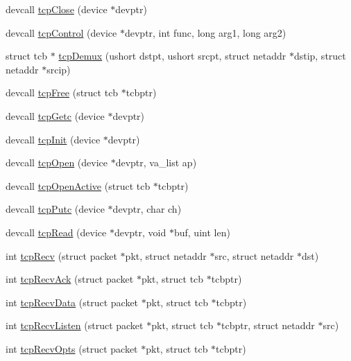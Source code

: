 \begin{DoxyCompactItemize}
\item 
devcall \hyperlink{group__tcp_gaf2201252cc913e86fe5a373d7de34ce1}{tcp\-Close} (device $\ast$devptr)
\item 
devcall \hyperlink{group__tcp_gaec53b1eedec31d820839a58848186ba8}{tcp\-Control} (device $\ast$devptr, int func, long arg1, long arg2)
\item 
struct tcb $\ast$ \hyperlink{group__tcp_gaa4058dc134ea0d6fe0e7317506d950f1}{tcp\-Demux} (ushort dstpt, ushort srcpt, struct netaddr $\ast$dstip, struct netaddr $\ast$srcip)
\item 
devcall \hyperlink{group__tcp_ga198efe4277244205130d48ee968f1637}{tcp\-Free} (struct tcb $\ast$tcbptr)
\item 
devcall \hyperlink{group__tcp_ga303c6d47bcc758c70437f3ff5c87eac8}{tcp\-Getc} (device $\ast$devptr)
\item 
devcall \hyperlink{group__tcp_gae7df99509f17d9b30690259c54609971}{tcp\-Init} (device $\ast$devptr)
\item 
devcall \hyperlink{group__tcp_ga230f078f96a8801c3ad397608bcf0024}{tcp\-Open} (device $\ast$devptr, va\-\_\-list ap)
\item 
devcall \hyperlink{group__tcp_ga72ec23c6f1f48df8cb9d1be254f78633}{tcp\-Open\-Active} (struct tcb $\ast$tcbptr)
\item 
devcall \hyperlink{group__tcp_ga806281518a04d24bb69d002f646de124}{tcp\-Putc} (device $\ast$devptr, char ch)
\item 
devcall \hyperlink{group__tcp_ga05afe88a1739bc885bb7c36e78b1abb8}{tcp\-Read} (device $\ast$devptr, void $\ast$buf, uint len)
\item 
int \hyperlink{group__tcp_gacfb5a1029610c46c6b613083c5c64b4b}{tcp\-Recv} (struct packet $\ast$pkt, struct netaddr $\ast$src, struct netaddr $\ast$dst)
\item 
int \hyperlink{group__tcp_gac5d9dee72be6259d34f7485488fa1ec2}{tcp\-Recv\-Ack} (struct packet $\ast$pkt, struct tcb $\ast$tcbptr)
\item 
int \hyperlink{group__tcp_ga30aa46165497d851dc343bc9e2213b49}{tcp\-Recv\-Data} (struct packet $\ast$pkt, struct tcb $\ast$tcbptr)
\item 
int \hyperlink{group__tcp_gadd802c3df4d82e41b0e5a1546298fad1}{tcp\-Recv\-Listen} (struct packet $\ast$pkt, struct tcb $\ast$tcbptr, struct netaddr $\ast$src)
\item 
int \hyperlink{group__tcp_gaf75dfc1963cc2d89642783340c207a6e}{tcp\-Recv\-Opts} (struct packet $\ast$pkt, struct tcb $\ast$tcbptr)
\item 

\end{DoxyCompactItemize}
